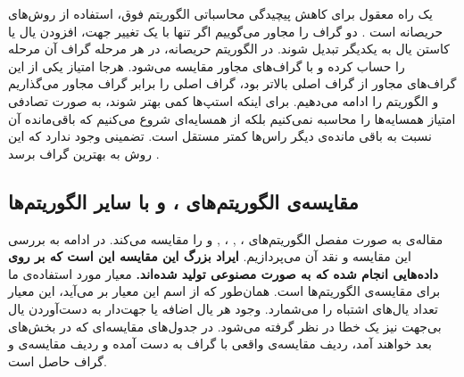 \documentclass[a4paper,12pt]{article}
\begin{document}
یک راه معقول برای کاهش پیچیدگی محاسباتی الگوریتم فوق، استفاده از روش‌های حریصانه است
\cite{continous}.
دو گراف را مجاور می‌گوییم اگر تنها با یک تغییر جهت، افزودن یال یا کاستن یال به یکدیگر تبدیل شوند. در الگوریتم حریصانه، در هر مرحله 
گراف آن مرحله را حساب کرده و با 
گراف‌های مجاور مقایسه‌ می‌شود. هرجا امتیاز یکی از این گراف‌های مجاور از گراف اصلی بالاتر بود، گراف اصلی را برابر گراف مجاور می‌گذاریم و الگوریتم را ادامه می‌دهیم. برای اینکه استپ‌ها کمی بهتر شوند، به صورت تصادفی امتیاز همسایه‌ها را محاسبه نمی‌کنیم بلکه از همسایه‌ای شروع می‌کنیم که باقی‌مانده آن نسبت به باقی ‌مانده‌ی دیگر راس‌ها کمتر مستقل است. تضمینی وجود ندارد که این روش به بهترین گراف برسد
\cite{continous}.

\subsection{مقایسه‌ی الگوریتم‌های‌
،
 و 
با سایر الگوریتم‌ها
}
مقاله‌ی 
\cite{continous}
به صورت مفصل الگوریتم‌های ،
, 
، 
,
و
را مقایسه می‌کند. در ادامه به بررسی این مقایسه و نقد آن می‌پردازیم. 
\textbf{ایراد بزرگ این مقایسه این است که بر روی داده‌هایی انجام شده که به صورت مصنوعی تولید شده‌اند.}
معیار مورد استفاده‌ی ما برای مقایسه‌ی الگوریتم‌ها  \textbf{} است.
	همان‌طور که از اسم این معیار بر می‌آید، این معیار تعداد یال‌های اشتباه را می‌شمارد. وجود هر یال اضافه یا جهت‌دار به دست‌آوردن یال بی‌جهت نیز یک خطا در نظر گرفته می‌شود. در جدول‌های مقایسه‌ای که در بخش‌های بعد خواهند آمد، ردیف 
	مقایسه‌ی 
	واقعی با گراف به دست آمده  و ردیف
	مقایسه‌ی
	و گراف حاصل است.  
	
\end{document}
